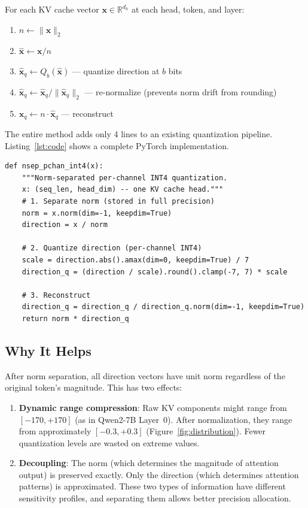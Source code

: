 \documentclass[11pt]{article}
\begin{document}
For each KV cache vector $\mathbf{x} \in \mathbb{R}^{d_h}$ at each head, token, and layer:
\begin{enumerate}[nosep]
  \item $n \leftarrow \|\mathbf{x}\|_2$
  \item $\hat{\mathbf{x}} \leftarrow \mathbf{x} / n$
  \item $\hat{\mathbf{x}}_q \leftarrow Q_b(\hat{\mathbf{x}})$ --- quantize direction at $b$ bits
  \item $\hat{\mathbf{x}}_q \leftarrow \hat{\mathbf{x}}_q / \|\hat{\mathbf{x}}_q\|_2$ --- re-normalize (prevents norm drift from rounding)
  \item $\mathbf{x}_q \leftarrow n \cdot \hat{\mathbf{x}}_q$ --- reconstruct
\end{enumerate}

The entire method adds only 4 lines to an existing quantization pipeline. Listing~\ref{lst:code} shows a complete PyTorch implementation.

\begin{lstlisting}[caption={Complete nsep+pchan4 implementation in PyTorch. The method adds 4 lines (norm separation and re-normalization) to standard per-channel INT4 quantization. No training or calibration required.},label={lst:code},float=h]
def nsep_pchan_int4(x):
    """Norm-separated per-channel INT4 quantization.
    x: (seq_len, head_dim) -- one KV cache head."""
    # 1. Separate norm (stored in full precision)
    norm = x.norm(dim=-1, keepdim=True)
    direction = x / norm

    # 2. Quantize direction (per-channel INT4)
    scale = direction.abs().amax(dim=0, keepdim=True) / 7
    direction_q = (direction / scale).round().clamp(-7, 7) * scale

    # 3. Reconstruct
    direction_q = direction_q / direction_q.norm(dim=-1, keepdim=True)
    return norm * direction_q
\end{lstlisting}

\subsection{Why It Helps}

After norm separation, all direction vectors have unit norm regardless of the original token's magnitude. This has two effects:

\begin{enumerate}[nosep]
  \item \textbf{Dynamic range compression}: Raw KV components might range from $[-170, +170]$ (as in Qwen2-7B Layer~0). After normalization, they range from approximately $[-0.3, +0.3]$ (Figure~\ref{fig:distribution}). Fewer quantization levels are wasted on extreme values.
  \item \textbf{Decoupling}: The norm (which determines the magnitude of attention output) is preserved exactly. Only the direction (which determines attention patterns) is approximated. These two types of information have different sensitivity profiles, and separating them allows better precision allocation.
\end{enumerate}
\end{document}
